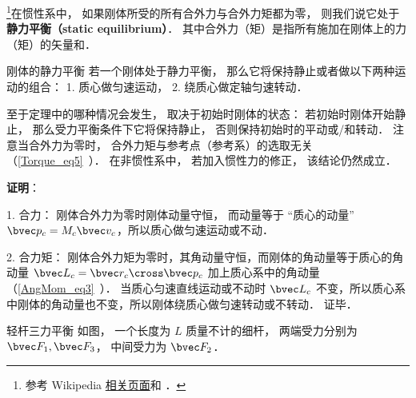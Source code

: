 

\footnote{参考 Wikipedia \href{https://en.wikipedia.org/wiki/Mechanical_equilibrium}{相关页面}和 \cite{新力}．}在惯性系中， 如果刚体所受的所有合外力与合外力矩都为零， 则我们说它处于\textbf{静力平衡（static equilibrium）}． 其中合外力（矩）是指所有施加在刚体上的力（矩）的矢量和．

\begin{theorem}{刚体的静力平衡}
若一个刚体处于静力平衡， 那么它将保持静止或者做以下两种运动的组合： 1. 质心做匀速运动， 2. 绕质心做定轴匀速转动．
\end{theorem}
至于定理中的哪种情况会发生， 取决于初始时刚体的状态： 若初始时刚体开始静止， 那么受力平衡条件下它将保持静止， 否则保持初始时的平动或/和转动． 注意当合外力为零时， 合外力矩与参考点（参考系）的选取无关（\autoref{Torque_eq5}~）． 在非惯性系中， 若加入惯性力的修正， 该结论仍然成立． 

\textbf{证明}：

1. 合力： 刚体合外力为零时刚体动量守恒， 而动量等于 “质心的动量” 
$\bvec p_c = M_c \bvec v_c$，所以质心做匀速运动或不动．

2. 合力矩： 刚体合外力矩为零时，其角动量守恒，而刚体的角动量等于质心的角动量 $\bvec L_c =\bvec r_c\cross \bvec p_c$ 加上质心系中的角动量（\autoref{AngMom_eq3}~）． 当质心匀速直线运动或不动时 $\bvec L_c$ 不变，所以质心系中刚体的角动量也不变，所以刚体绕质心做匀速转动或不转动． 证毕．

\begin{example}{轻杆三力平衡}
如图， 一个长度为 $L$ 质量不计的细杆， 两端受力分别为 $\bvec F_1, \bvec F_3$， 中间受力为 $\bvec F_2$．
\end{example}


